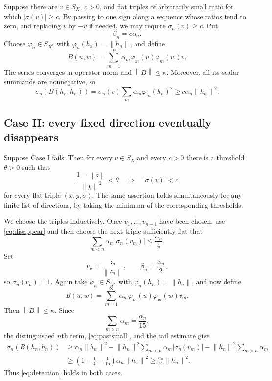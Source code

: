 \documentclass[11pt]{article}
\newcommand{\norm}[1]{\left\lVert #1\right\rVert}
\newcommand{\SX}{S_X}
\begin{document}
Suppose there are $v\in\SX$, $c>0$, and flat triples of arbitrarily small
ratio for which $|\sigma(v)|\geq c$.  By passing to one sign along a
sequence whose ratios tend to zero, and replacing $v$ by $-v$ if needed,
we may require $\sigma_n(v)\geq c$.  Put
\[
                         \beta_n=c\alpha_n.
\]
Choose $\varphi_n\in S_{X^*}$ with
$\varphi_n(h_n)=\norm{h_n}$, and define
\begin{equation}\label{eq:Bcase1}
 B(u,w)=\sum_{m=1}^\infty
       \alpha_m\varphi_m(u)\varphi_m(w)v.
\end{equation}
The series converges in operator norm and $\norm{B}\leq\kappa$.  Moreover,
all its scalar summands are nonnegative, so
\[
 \sigma_n(B(h_n,h_n))
 =\sigma_n(v)\sum_m\alpha_m\varphi_m(h_n)^2
 \geq c\alpha_n\norm{h_n}^2.
\]

\subsection*{Case II: every fixed direction eventually disappears}

Suppose Case I fails.  Then for every $v\in\SX$ and every $c>0$ there is a
threshold $\theta>0$ such that
\begin{equation}\label{eq:disappear}
 \frac{1-\norm{z}}{\norm{h}^2}<\theta
 \quad\Longrightarrow\quad |\sigma(v)|<c
\end{equation}
for every flat triple $(x,y,\sigma)$.  The same assertion holds
simultaneously for any finite list of directions, by taking the minimum of
the corresponding thresholds.

We choose the triples inductively.  Once $v_1,\ldots,v_{n-1}$ have been
chosen, use \eqref{eq:disappear} and then choose the next triple sufficiently
flat that
\begin{equation}\label{eq:pastsmall}
                 \sum_{m<n}\alpha_m|\sigma_n(v_m)|
                 \leq\frac{\alpha_n}{4}.
\end{equation}
Set
\[
 v_n=\frac{z_n}{\norm{z_n}},\qquad
 \beta_n=\frac{\alpha_n}{2},
\]
so $\sigma_n(v_n)=1$.  Again take
$\varphi_n\in S_{X^*}$ with
$\varphi_n(h_n)=\norm{h_n}$, and now define
\begin{equation}\label{eq:Bcase2}
 B(u,w)=\sum_{m=1}^\infty
       \alpha_m\varphi_m(u)\varphi_m(w)v_m.
\end{equation}
Then $\norm{B}\leq\kappa$.  Since
\[
                  \sum_{m>n}\alpha_m=\frac{\alpha_n}{15},
\]
the distinguished $n$th term, \eqref{eq:pastsmall}, and the tail estimate
give
\begin{align*}
 \sigma_n(B(h_n,h_n))
 &\geq \alpha_n\norm{h_n}^2
   -\norm{h_n}^2\sum_{m<n}\alpha_m|\sigma_n(v_m)|
   -\norm{h_n}^2\sum_{m>n}\alpha_m\\
 &\geq\left(1-\frac14-\frac1{15}\right)
       \alpha_n\norm{h_n}^2
 \geq\frac{\alpha_n}{2}\norm{h_n}^2.
\end{align*}
Thus \eqref{eq:detection} holds in both cases.
\end{document}
